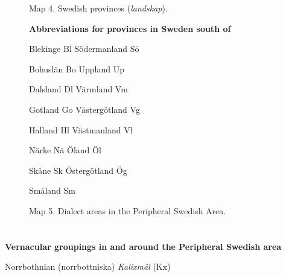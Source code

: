 \begin{figure}[h]



\label{bkm:Ref264031279}Map 4. Swedish provinces (\textit{landskap}).




\end{figure}

\begin{figure}[h]



\textbf{Abbreviations for provinces in Sweden south of}

Blekinge  Bl  Södermanland  Sö

Bohuslän  Bo  Uppland  Up

Dalsland  Dl  Värmland  Vm

Gotland  Go  Västergötland  Vg

Halland  Hl  Västmanland  Vl

Närke  Nä  Öland  Öl

Skåne  Sk  Östergötland  Ög

Småland  Sm    



\end{figure}

\begin{figure}[h]



\label{bkm:Ref216765041}Map 5. Dialect areas in the Peripheral Swedish Area.




\end{figure}

\section{ }

\textbf{Vernacular groupings in and around the Peripheral Swedish area}

\item 

Norrbothnian (norrbottniska)  \textit{Kalixmål} (Kx)

